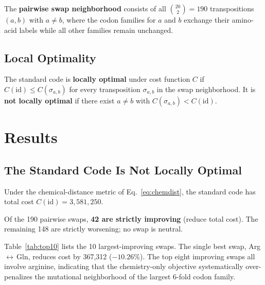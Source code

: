 \documentclass[11pt,twocolumn]{article}
\begin{document}
The \textbf{pairwise swap neighborhood} consists of all
$\binom{20}{2} = 190$ transpositions $(a, b)$ with $a \neq b$, where the
codon families for $a$ and $b$ exchange their amino-acid labels while all
other families remain unchanged.

\subsection{Local Optimality}

The standard code is \textbf{locally optimal} under cost function $C$ if
$C(\text{id}) \leq C(\sigma_{a,b})$ for every transposition $\sigma_{a,b}$
in the swap neighborhood. It is \textbf{not locally optimal} if there exist
$a \neq b$ with $C(\sigma_{a,b}) < C(\text{id})$.

\section{Results}

\subsection{The Standard Code Is Not Locally Optimal}

Under the chemical-distance metric of Eq.~\eqref{eq:chemdist}, the
standard code has total cost $C(\text{id}) = 3{,}581{,}250$.

Of the 190 pairwise swaps, \textbf{42 are strictly improving} (reduce
total cost). The remaining 148 are strictly worsening; no swap is neutral.

Table~\ref{tab:top10} lists the 10 largest-improving swaps. The single
best swap, Arg\,$\leftrightarrow$\,Gln, reduces cost by 367,312
($-10.26\%$). The top eight improving swaps all involve arginine, indicating
that the chemistry-only objective systematically over-penalizes the mutational
neighborhood of the largest 6-fold codon family.
\end{document}
